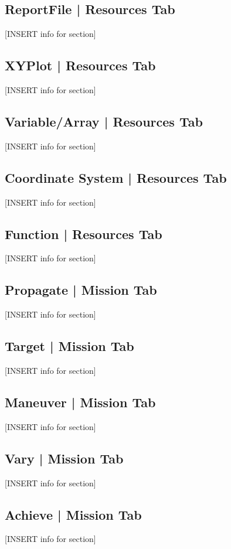         \subsection{ReportFile | Resources Tab}
        [INSERT info for section]

        \subsection{XYPlot | Resources Tab}
        [INSERT info for section]

        \subsection{Variable/Array | Resources Tab}
        [INSERT info for section]

        \subsection{Coordinate System | Resources Tab}
        [INSERT info for section]

        \subsection{Function | Resources Tab}
        [INSERT info for section]

        \subsection{Propagate | Mission Tab}
        [INSERT info for section]

        \subsection{Target | Mission Tab}
        [INSERT info for section]

        \subsection{Maneuver | Mission Tab}
        [INSERT info for section]

        \subsection{Vary | Mission Tab}
        [INSERT info for section]

        \subsection{Achieve | Mission Tab}
        [INSERT info for section]

